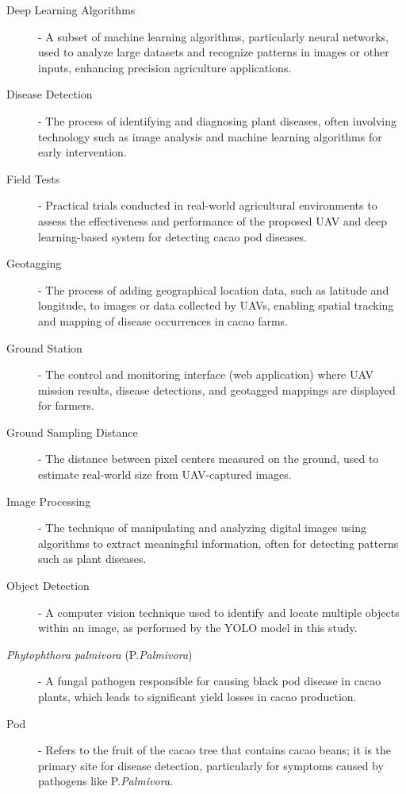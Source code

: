 {\begin{description}
	\item[Deep Learning Algorithms] - A subset of machine learning algorithms, particularly neural networks, used to analyze large datasets and recognize patterns in images or other inputs, enhancing precision agriculture applications.

	\item[Disease Detection] - The process of identifying and diagnosing plant diseases, often involving technology such as image analysis and machine learning algorithms for early intervention.

	\item[Field Tests] - Practical trials conducted in real-world agricultural environments to assess the effectiveness and performance of the proposed UAV and deep learning-based system for detecting cacao pod diseases.

	\item[Geotagging] - The process of adding geographical location data, such as latitude and longitude, to images or data collected by UAVs, enabling spatial tracking and mapping of disease occurrences in cacao farms.
	
	\item[Ground Station] - The control and monitoring interface (web application) where UAV mission results, disease detections, and geotagged mappings are displayed for farmers.
	
	\item[Ground Sampling Distance] - The distance between pixel centers measured on the ground, used to estimate real-world size from UAV-captured images.

	\item[Image Processing] - The technique of manipulating and analyzing digital images using algorithms to extract meaningful information, often for detecting patterns such as plant diseases.

	\item[Object Detection] - A computer vision technique used to identify and locate multiple objects within an image, as performed by the YOLO model in this study.
	
	\item[\textit{Phytophthora palmivora} (P.\textit{Palmivora})] - A fungal pathogen responsible for causing black pod disease in cacao plants, which leads to significant yield losses in cacao production.

	\item[Pod] - Refers to the fruit of the cacao tree that contains cacao beans; it is the primary site for disease detection, particularly for symptoms caused by pathogens like P.\textit{Palmivora}.


\end{description}}

